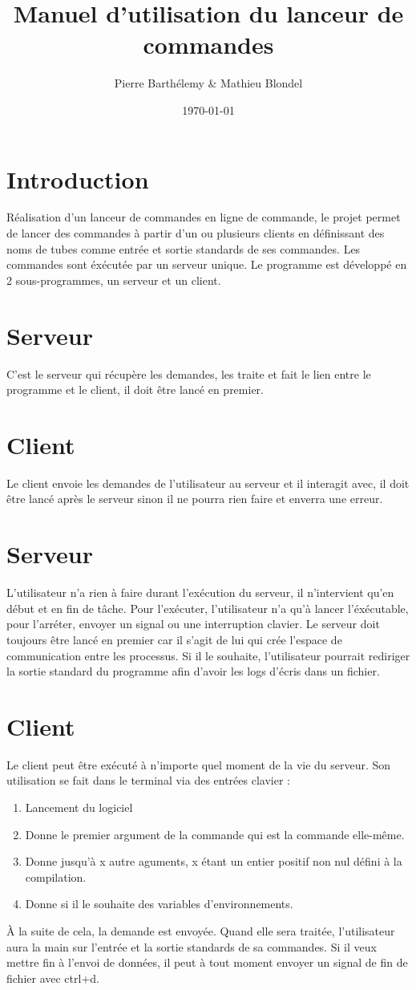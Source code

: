 \documentclass[12pt]{article}
\title{Manuel d'utilisation du lanceur de commandes}
\author{Pierre Barthélemy & Mathieu Blondel}
\date{\today}
\begin{document}
\maketitle
\newpage
\tableofcontents
\newpage
\section{Introduction}
    Réalisation d'un lanceur de commandes en ligne de commande, le projet permet de lancer des commandes à partir d'un ou plusieurs clients en définissant des noms de tubes comme entrée et sortie standards de ses commandes. Les commandes sont éxécutée par un serveur unique.
    Le programme est développé en 2 sous-programmes, un serveur et un client.
\section*{Serveur}
    C'est le serveur qui récupère les demandes, les traite et fait le lien entre le programme et le client, il doit être lancé en premier.
\section*{Client}
    Le client envoie les demandes de l'utilisateur au serveur et il interagit avec, il doit être lancé après le serveur sinon il ne pourra rien faire et enverra une erreur.
\newpage

\section{Serveur}
    L'utilisateur n'a rien à faire durant l'exécution du serveur, il n'intervient qu'en début et en fin de tâche.
    Pour l'exécuter, l'utilisateur n'a qu'à lancer l'éxécutable, pour l'arréter, envoyer un signal ou une interruption clavier.
    Le serveur doit toujours être lancé en premier car il s'agit de lui qui crée l'espace de communication entre les processus.
    Si il le souhaite, l'utilisateur pourrait rediriger la sortie standard du programme afin d'avoir les logs d'écris dans un fichier.
\newpage

\section{Client}
    Le client peut être exécuté à n'importe quel moment de la vie du serveur.
    Son utilisation se fait dans le terminal via des entrées clavier :
      \begin{enumerate}
        \item Lancement du logiciel
        \item Donne le premier argument de la commande qui est la commande elle-même.
        \item Donne jusqu'à x autre aguments, x étant un entier positif non nul défini à la compilation.
        \item Donne si il le souhaite des variables d'environnements.
      \end{enumerate}
    À la suite de cela, la demande est envoyée. Quand elle sera traitée, l'utilisateur aura la main
    sur l'entrée et la sortie standards de sa commandes. Si il veux mettre fin à l'envoi de données, il peut à tout moment envoyer un signal de fin de fichier avec ctrl+d.
\end{document}
